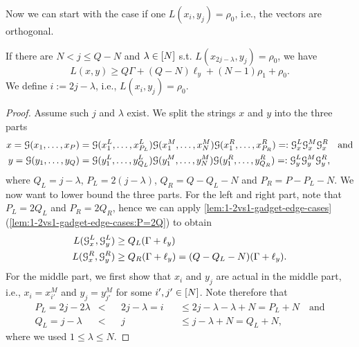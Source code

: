 Now we can start with the case if one $L(x_i, y_j) = \rho_0$, i.e., the vectors are orthogonal.

\begin{lemma}
\label{lem:1-2vs1:ortho-lower-bound}
If there are $N < j \leq Q-N$ and $\lambda \in [N]$ s.t. $L(x_{2j-\lambda}, y_j) = \rho_0$, we have
\[ 
L(x,y) \geq Q\Gamma + (Q-N)\ell_y + (N-1)\rho_1 + \rho_0.
\]
We define $i := 2j - \lambda$, i.e., $L(x_i, y_j) = \rho_0$.
\end{lemma}

\begin{proof}
Assume such $j$ and $\lambda$ exist.
We split the strings $x$ and $y$ into the three parts
\begin{align*}
x = \mathcal{G}(x_1, \ldots, x_P) &= \mathcal{G}(x^L_1, \ldots, x^L_{P_L}) \mathcal{G}(x^M_1, \ldots, x^M_N) \mathcal{G}(x^R_1, \ldots, x^R_{P_R}) =: \mathcal{G}^L_x\mathcal{G}^M_x\mathcal{G}^R_x \quad\text{and}\\
y = \mathcal{G}(y_1, \ldots, y_Q) &= \mathcal{G}(y^L_1, \ldots, y^L_{Q_L}) \mathcal{G}(y^M_1, \ldots, y^M_N) \mathcal{G}(y^R_1, \ldots, y^R_{Q_R}) =: \mathcal{G}^L_y\mathcal{G}^M_y\mathcal{G}^R_y,
\end{align*}
where $Q_L = j - \lambda$, $P_L = 2(j - \lambda)$, $Q_R = Q - Q_L - N$ and $P_R = P - P_L - N$.
We now want to lower bound the three parts. %
For the left and right part, note that $P_L = 2Q_L$ and $P_R = 2Q_R$, hence we can apply \autoref{lem:1-2vs1-gadget-edge-cases} (\ref{lem:1-2vs1-gadget-edge-cases:P=2Q}) to obtain
\begin{align*}
L(\mathcal{G}^L_x, \mathcal{G}^L_y) &\geq Q_L(\Gamma + \ell_y) \\
L(\mathcal{G}^R_x, \mathcal{G}^R_y) &\geq Q_R(\Gamma + \ell_y) = (Q - Q_L - N)(\Gamma + \ell_y).
\end{align*}
For the middle part, we first show that $x_i$ and $y_j$ are actual in the middle part, i.e., $x_i = x^M_{i'}$ and $y_j = y^M_{j'}$ for some $i', j' \in [N]$.
Note therefore that
\begin{align*}
P_L = 2j - 2\lambda &<& &2j - \lambda = i& &\leq 2j - \lambda - \lambda + N = P_L + N \quad\text{and}\\
Q_L = j - \lambda &<& &j& &\leq j - \lambda + N = Q_L + N,
\end{align*}
where we used $1 \leq \lambda \leq N$.

\end{proof}
